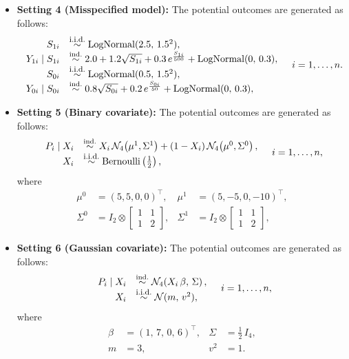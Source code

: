 \documentclass[referee,usenatbib]{biom}
\newcommand{\iid}{\overset{\text{\footnotesize i.i.d.}}{\sim}}
\newcommand{\indepsim}{\overset{\text{ind.}}{\sim}}
\begin{document}
\begin{itemize}[leftmargin=*]
\begin{align*}
    \end{align*}
    \item \textbf{Setting 4 (Misspecified model):} The potential outcomes are generated as follows:
    \begin{equation*}
    \begin{array}{rl}
        S_{1i} & \iid \text{LogNormal}(2.5,\, 1.5^2), \\
        Y_{1i} \mid S_{1i} & \indepsim 2.0 + 1.2\sqrt{S_{1i}} + 0.3\,e^{\frac{S_{1i}}{500}} + \text{LogNormal}(0,\, 0.3), \\
        S_{0i} & \iid \text{LogNormal}(0.5,\, 1.5^2), \\
        Y_{0i} \mid S_{0i} & \indepsim 0.8\sqrt{S_{0i}} + 0.2\,e^{\frac{S_{0i}}{50}} + \text{LogNormal}(0,\, 0.3),
    \end{array}
    \quad i = 1, \ldots, n.
    \end{equation*}
    \item \textbf{Setting 5 (Binary covariate):} The potential outcomes are generated as follows:
    \begin{equation*}
    \begin{array}{rl}
        P_{i} \mid X_{i} & \indepsim X_{i}\,\mathcal{N}_{4}\!\left(\mu^{1}, \Sigma^{1}\right) + (1 - X_{i})\,\mathcal{N}_{4}\!\left(\mu^{0}, \Sigma^{0}\right), \\
        X_i & \iid \text{Bernoulli} \left( \frac{1}{2} \right),
    \end{array}
    \quad i = 1, \ldots, n,
    \end{equation*}
    where
    \begin{align*}
        \mu^{0} &= (5, 5, 0, 0)^\top, &
        \mu^{1} &= (5, -5, 0, -10)^\top, \\
        \Sigma^{0} &= I_2 \otimes \begin{bmatrix} 1 & 1 \\ 1 & 2 \end{bmatrix}, &
        \Sigma^{1} &= I_2 \otimes \begin{bmatrix} 1 & 1 \\ 1 & 2 \end{bmatrix},
    \end{align*}
    \item \textbf{Setting 6 (Gaussian covariate):} The potential outcomes are generated as follows:
    \begin{equation*}
    \begin{array}{rl}
        P_{i} \mid X_{i} & \indepsim \mathcal{N}_{4}\!\left(X_{i}\,\beta,\, \Sigma\right), \\
        X_i & \iid \mathcal{N}(m,\, v^2),
    \end{array}
    \quad i = 1, \ldots, n,
    \end{equation*}
    where
    \begin{align*}
        \beta &= (1,\, 7,\, 0,\, 6)^\top, &
        \Sigma &= \tfrac{1}{2}\, I_{4}, \\
        m &= 3, &
        v^2 &= 1.
    \end{align*}
\end{itemize}
\end{document}
